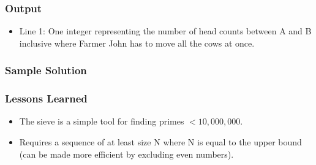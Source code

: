 

\subsubsection{Output}
\begin{itemize}
	\item Line 1: One integer representing the number of head counts between A and B inclusive where Farmer John has to move all the cows at once.
\end{itemize}



\subsubsection{Sample Solution}


\subsubsection{Lessons Learned}
\begin{itemize}
	\item The sieve is a simple tool for finding primes $<10,000,000$.
	\item Requires a sequence of at least size N where N is equal to the upper bound (can be made more efficient by excluding even numbers).
\end{itemize}
